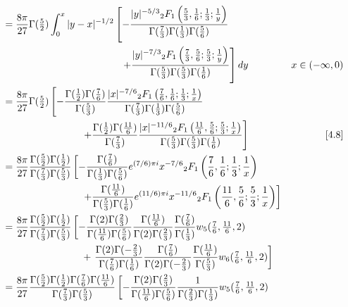 \documentclass[11pt,a4paper,twoside,leqno,noamsfonts]{amsart}
\numberwithin{equation}{section}
\begin{document}
\begin{example}[Airy]
\begin{align*}
&=\frac{8\pi}{27} \Gamma(\tfrac{5}{2}) \int_0^x |y-x|^{-1/2}\left[ -\frac{|y|^{-5/3} {}_2F_1\left(\frac{5}{3},\frac{1}{6};\frac{1}{3};\frac{1}{y}\right)}{\Gamma(\tfrac{7}{3}) \Gamma(\tfrac{1}{3}) \Gamma(\tfrac{5}{6})} \right. \\
& \qquad\qquad\qquad\qquad\qquad\qquad \left. + \frac{|y|^{-7/3} {}_2F_1\left(\frac{7}{3},\frac{5}{6};\frac{5}{3};\frac{1}{y}\right)}{\Gamma(\tfrac{5}{3}) \Gamma(\tfrac{5}{3}) \Gamma(\tfrac{1}{6})} \right]dy & x\in (-\infty,0) \\
&=\frac{8\pi}{27} \Gamma(\tfrac{5}{2}) \left[ -\frac{\Gamma(\tfrac{1}{2}) \Gamma(\tfrac{7}{6})}{\Gamma(\tfrac{5}{3})} \frac{|x|^{-7/6} {}_2F_1\left(\frac{7}{6},\frac{1}{6};\frac{1}{3};\frac{1}{x}\right)}{\Gamma(\tfrac{7}{3}) \Gamma(\tfrac{1}{3}) \Gamma(\tfrac{5}{6})} \right. \\
& \qquad\qquad\qquad\qquad \left. + \frac{\Gamma(\tfrac{1}{2}) \Gamma(\tfrac{11}{6})}{\Gamma(\tfrac{7}{3})} \frac{|x|^{-11/6} {}_2F_1\left(\frac{11}{6},\frac{5}{6};\frac{5}{3};\frac{1}{x}\right)}{\Gamma(\tfrac{5}{3}) \Gamma(\tfrac{5}{3}) \Gamma(\tfrac{1}{6})} \right] & \eqref{4.8} \\
&=\frac{8\pi}{27} \frac{\Gamma(\tfrac{5}{2}) \Gamma(\tfrac{1}{2})}{\Gamma(\tfrac{7}{3}) \Gamma(\tfrac{5}{3})} \left[ -\frac{\Gamma(\tfrac{7}{6})}{\Gamma(\tfrac{1}{3}) \Gamma(\tfrac{5}{6})} e^{(7/6) \pi i} x^{-7/6} {}_2F_1\left(\frac{7}{6},\frac{1}{6};\frac{1}{3};\frac{1}{x}\right) \right. \\
& \left. \qquad\qquad\qquad\qquad + \frac{\Gamma(\tfrac{11}{6})}{\Gamma(\tfrac{5}{3}) \Gamma(\tfrac{1}{6})} e^{(11/6) \pi i} x^{-11/6} {}_2F_1\left(\frac{11}{6},\frac{5}{6};\frac{5}{3};\frac{1}{x}\right) \right] \\
&=\frac{8\pi}{27} \frac{\Gamma(\tfrac{5}{2}) \Gamma(\tfrac{1}{2})}{\Gamma(\tfrac{7}{3}) \Gamma(\tfrac{5}{3})} \left[ -\frac{\Gamma(2) \Gamma(\tfrac{2}{3})}{\Gamma(\tfrac{11}{6}) \Gamma(\tfrac{5}{6})} \frac{\Gamma(\tfrac{11}{6})}{\Gamma(2) \Gamma(\tfrac{2}{3})} \frac{\Gamma(\tfrac{7}{6})}{\Gamma(\tfrac{1}{3})} w_5(\tfrac{7}{6}, \tfrac{11}{6}, 2) \right. \\
& \qquad\qquad\qquad\qquad + \left. \frac{\Gamma(2) \Gamma(-\tfrac{2}{3})}{\Gamma(\tfrac{7}{6}) \Gamma(\tfrac{1}{6})} \frac{\Gamma(\tfrac{7}{6})}{\Gamma(2) \Gamma(-\tfrac{2}{3})} \frac{\Gamma(\tfrac{11}{6})}{\Gamma(\tfrac{5}{3})} w_6(\tfrac{7}{6}, \tfrac{11}{6}, 2) \right] \\
&=\frac{8\pi}{27} \frac{\Gamma(\tfrac{5}{2}) \Gamma(\tfrac{1}{2}) \Gamma(\tfrac{7}{6}) \Gamma(\tfrac{11}{6})}{\Gamma(\tfrac{7}{3}) \Gamma(\tfrac{5}{3})} \left[ -\frac{\Gamma(2) \Gamma(\tfrac{2}{3})}{\Gamma(\tfrac{11}{6}) \Gamma(\tfrac{5}{6})} \frac{1}{\Gamma(\tfrac{2}{3}) \Gamma(\tfrac{1}{3})} w_5(\tfrac{7}{6}, \tfrac{11}{6}, 2) \right. \\

\end{align*}
\end{example}
\end{document}
